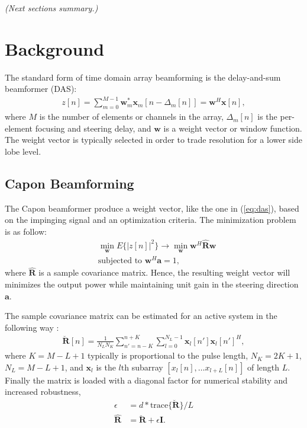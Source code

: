 \documentclass[journal]{IEEEtran}
\newcommand{\mat}[1]{\mathbf{#1}}
\renewcommand{\vec}[1]{\mathbf{#1}}
\newcommand\comment[1]{\textit{{\color{red}(#1)}}}
\begin{document}
\comment{Next sections summary.}


\section{Background}

The standard form of time domain array beamforming is the delay-and-sum beamformer (DAS):
\begin{align}\label{eq:das}
z[n] = \sum_{m = 0}^{M-1}\vec{w}_m^*\vec{x}_m[n - \Delta_m[n]] = \vec{w}^H\vec{x}[n],
\end{align}
where $M$ is the number of elements or channels in the array, $\Delta_m[n]$ is the per-element focusing and steering delay, and $\vec{w}$ is a weight vector or window function. The weight vector is typically selected in order to trade resolution for a lower side lobe level.

\subsection{Capon Beamforming}
The Capon beamformer produce a weight vector, like the one in (\ref{eq:das}), based on the impinging signal and an optimization criteria. The minimization problem is as follow:
\begin{align}
&\min_{\vec{w}} E\{|z[n]|^2\} \rightarrow \min_{\vec{w}} \vec{w}^H \mat{\hat{R}} \vec{w} \label{eq:capon_optimization_criteria} \\
&\text{subjected to } \vec{w}^H\vec{a} = 1,
\end{align}
where $\mat{\hat{R}}$ is a sample covariance matrix. Hence, the resulting weight vector will minimizes the output power while maintaining unit gain in the steering direction $\vec{a}$. %

The sample covariance matrix can be estimated for an active system in the following way \cite{Synnevag2009}:
\begin{align}
\mat{\breve{R}}[n] = \frac{1}{N_LN_K}\sum_{n'=n-K}^{n+K} \sum_{l=0}^{N_L-1} \vec{x}_l[n']\vec{x}_l[n']^H,
\end{align}
where $K = M-L+1$ typically is proportional to the pulse length, $N_K = 2K + 1$, $N_L = M-L+1$, and $\vec{x}_l$ is the $l\text{th}$ subarray $[x_l[n], \dotso x_{l+L}[n]]$ of length $L$. Finally the matrix is loaded with a diagonal factor for numerical stability and increased robustness, 
\begin{align}
\epsilon &= d*\text{trace}\{\mat{\breve{R}}\}/L\\
\mat{\hat{R}} &= \mat{\breve{R}} + \epsilon\mat{I}.
\end{align} 
\end{document}

